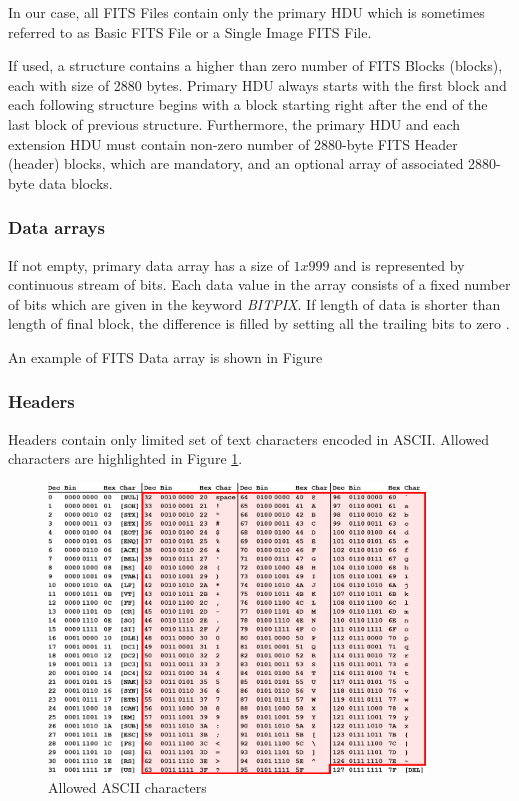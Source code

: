 	In our case, all FITS Files contain only the primary HDU which is sometimes referred to as Basic FITS File or a Single Image FITS File.
	
	If used, a structure contains a higher than zero number of FITS Blocks (blocks), each with size of 2880 bytes. Primary HDU always starts with the first block and each following structure begins with a block starting right after the end of the last block of previous structure. Furthermore, the primary HDU and each extension HDU must contain non-zero number of 2880-byte FITS Header (header) blocks, which are mandatory, and an optional array of associated 2880-byte data blocks\citep{FITSdefinition}.
	
\subsubsection{Data arrays} 
	
	If not empty, primary data array has a size of $1 x 999$ and is represented by continuous stream of bits. Each data value in the array consists of a fixed number of bits which are given in the keyword \emph{BITPIX}. If length of data is shorter than length of final block, the difference is filled by setting all the trailing bits to zero \citep{FITSdefinition}.
	
	An example of FITS Data array is shown in Figure
	
\subsubsection{Headers}

	Headers contain only limited set of text characters encoded in ASCII. Allowed characters are highlighted in Figure \ref{fig:allowed_ascii}.
	
	\begin{figure}[H]
	\centering
	  \includegraphics[width=10cm]{images/asciifull}
		  \caption{Allowed ASCII characters}
	  \label{fig:allowed_ascii}
	\end{figure}
	
